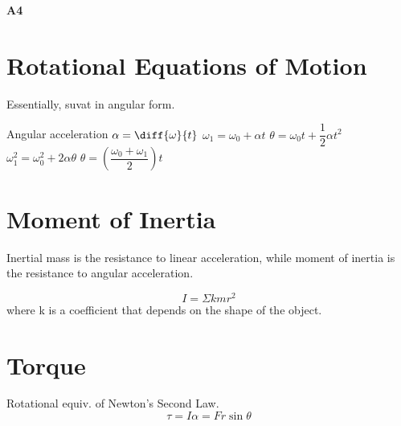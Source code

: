 \documentclass[a4paper,12pt]{article}
\begin{document}
\pagestyle{fancy}


\begin{titlepage}
  \begin{center}
    \vspace*{3cm}

    \textbf{\Large  {A4}}

    \vspace{1cm}


    \vfill

    \vspace{1.5cm}

  \end{center}
\end{titlepage}
\pagebreak
\tableofcontents
\pagebreak

\clearpage
\setcounter{page}{1}

\pagebreak

\section{Rotational Equations of Motion}

Essentially, suvat in angular form.

\begin{outline}[enumerate]
  \1 Angular acceleration $\alpha = \diff{\omega}{t}$
  \1 $\omega_1 = \omega_0 + \alpha t$
  \1 $\theta = \omega_0 t + \dfrac{1}{2}\alpha t^2$
  \1 $\omega_1^2 = \omega_0^2 + 2\alpha\theta$
  \1 $\theta = \left(\dfrac{\omega_0 + \omega_1}{2}\right)t$
\end{outline}

\section{Moment of Inertia}

Inertial mass is the resistance to linear acceleration, while moment of inertia is the resistance to angular acceleration.

$$I=\Sigma{kmr^2}$$
where k is a coefficient that depends on the shape of the object.

\pagebreak

\section{Torque}

Rotational equiv. of Newton's Second Law.
$$\tau = I\alpha = Fr\sin\theta$$
\end{document}
